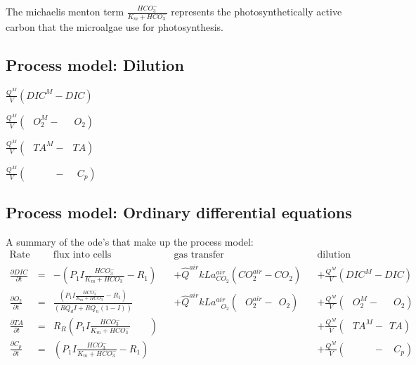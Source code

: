 \documentclass{ruthesis}
\begin{document}
The michaelis menton term $ \frac{HCO_3^-}{K_m + HCO_3^-} $ represents the photosynthetically active carbon that the microalgae use for photosynthesis. 

\subsection{Process model: Dilution}

$ \frac{Q^M}{V}(DIC^{M} - DIC) $

$ \frac{Q^M}{V}(\phantom{C}O_{2}^{M} - \phantom{CC}O_{2}) $

$ \frac{Q^M}{V}(\phantom{C}TA^{M} - \phantom{C}TA) $

$ \frac{Q^M}{V}(\phantom{CTA^{M}} - \phantom{IC}C_p) $



\subsection{Process model: Ordinary differential equations}\label{sec:micro_process_model}

A summary of the ode's that make up the process model:
\begin{align}
\text{Rate} & & \text{flux into cells}            &            &\text{gas transfer}   &     & \text{dilution} \nonumber                              \\
\frac{\partial DIC}{\partial t}&=&                      - (P_1 I \frac{HCO_3^-}{K_m + HCO_3^-} - R_1)&      &+\hat Q^{air}kLa_{ CO_2}^{air}(CO_{2}^{air} - CO_{2})                  & &+\frac{Q^M}{V}(DIC^{M} - DIC)       \nonumber \\
\frac{\partial O_2}{\partial t}&=& \frac{(P_1 I \frac{HCO_3^-}{K_m + HCO_3^-} - R_1)}{(RQ_d I + RQ_n(1-I))}  &      &+\hat Q^{air}kLa_{\phantom{C}O_2}^{air}(\phantom{C}O_{2}^{air} - \phantom{I}O_{2}) && +\frac{Q^M}{V}(\phantom{C}O_{2}^{M} - \phantom{CC}O_{2})     \nonumber   \\
\frac{\partial TA}{\partial t} & =&      R_R (P_1 I \frac{HCO_3^-}{K_m + HCO_3^-} \phantom{ + R_1})& & & & +\frac{Q^M}{V}(\phantom{C}TA^{M} - \phantom{I}TA) \nonumber\\
\frac{\partial C_p}{\partial t} & =& (P_1 I \frac{HCO_3^-}{K_m + HCO_3^-} - R_1)&  & & & +\frac{Q^M}{V}(\phantom{CTA^{M}} - \phantom{II}C_p) 
\end{align}
\end{document}
